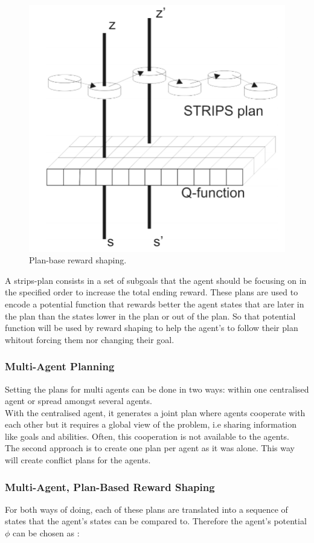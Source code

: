 \documentclass[letterpaper]{article}
\begin{document}
\begin{figure}[h!]
\centering
  \includegraphics[width=0.75\linewidth]{img/strips.png}
  \caption{Plan-base reward shaping.}
  \label{fig:strips}
\end{figure}


A strips-plan consists in a set of subgoals that the agent should be focusing on in the specified order to increase the total ending reward. These plans are used to encode a potential function that rewards better the agent states that are later in the plan than the states lower in the plan or out of the plan. So that potential function will be used by reward shaping to help the agent's to follow their plan whitout forcing them nor changing their goal. 

\subsubsection{Multi-Agent Planning}
Setting the plans for multi agents can be done in two ways: within one centralised agent or spread amongst several agents.\\
With the centralised agent, it generates a joint plan where agents cooperate with each other but it requires a global view of the problem, i.e sharing information like goals and abilities. Often, this cooperation is not available to the agents.\\
The second approach is to create one plan per agent as it was alone. This way will create conflict plans for the agents.


\subsubsection{Multi-Agent, Plan-Based Reward Shaping}
For both ways of doing, each of these plans are translated into a sequence of states that the agent's states can be compared to. Therefore the agent's potential $\phi$ can be chosen as :\\
\end{document}

